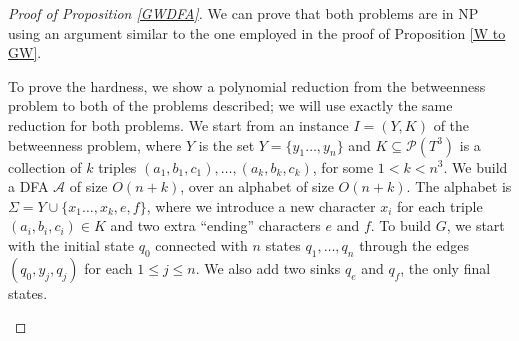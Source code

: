 \documentclass[runningheads]{llncs}
\newcommand{\tocheck}[1]{{\color{blue} #1}}
\begin{document}
\begin{proof}[\noindent Proof of Proposition \ref{GWDFA}]
We can prove that both problems are in NP using an argument similar to the one employed in the proof of Proposition \ref{W to GW}.

To prove the hardness, we show a polynomial reduction from the betweenness problem to both of the problems described; we will use exactly the same reduction for both problems. We start from an instance $I=(Y,K)$ of the betweenness problem, where $Y$ is the set $Y=\{y_1\dots,y_n\}$ and $K\subseteq \mathcal P(T^3)$ is a collection of $k$ triples $(a_1,b_1,c_1),\dots, (a_k,b_k,c_k)$, for some $1<k<n^3$. We build a DFA $\mathcal A$ of size $O(n+k)$, over an alphabet of size $O(n+k)$. The alphabet is $\Sigma=Y\cup\{x_1\dots,x_k,e,f\}$, where we introduce a new character $x_i$ for each triple $(a_i,b_i,c_i)\in K$ and two extra ``ending'' characters $e$ and $f$. To build $G$, we start with the initial state $q_0$ connected with $n$ states $q_1, \dots,q_n$ through the edges $(q_0,y_j,q_j)$ for each $1\le j\le n$. We also add two sinks $q_e$ and $q_f$, the only final states. %
\begin{figure}
\begin{center}
\end{center}
\end{figure}
\end{proof}
\end{document}
